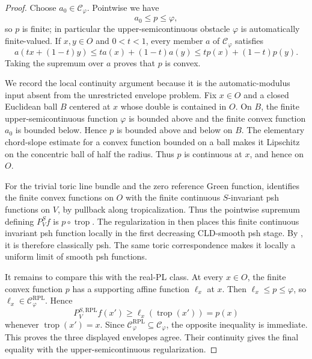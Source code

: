 \begin{proof}
Choose $a_0\in\mathcal C_\varphi$.  Pointwise we have
\[
                       a_0\leq p\leq\varphi,
\]
so $p$ is finite; in particular the upper-semicontinuous obstacle
\(\varphi\) is automatically finite-valued.  If $x,y\in O$ and $0<t<1$, every member $a$ of
\(\mathcal C_\varphi\) satisfies
\[
 a(tx+(1-t)y)\leq ta(x)+(1-t)a(y)
              \leq tp(x)+(1-t)p(y).
\]
Taking the supremum over $a$ proves that $p$ is convex.

We record the local continuity argument because it is the automatic-modulus
input absent from the unrestricted envelope problem.  Fix $x\in O$ and a
closed Euclidean ball $B$ centered at $x$ whose double is contained in $O$.
On $B$, the finite upper-semicontinuous function $\varphi$ is bounded above
and the finite convex function $a_0$ is bounded below.  Hence $p$ is bounded
above and below on $B$.  The elementary chord-slope estimate for a convex
function bounded on a ball makes it Lipschitz on the concentric ball of half
the radius.  Thus $p$ is continuous at $x$, and hence on $O$.

For the trivial toric line bundle and the zero reference Green function,
\cite[Theorem~5.3.11]{BGJKK25} identifies the finite convex functions on
$O$ with the finite continuous $S$-invariant psh functions on $V$, by
pullback along tropicalization.  Thus the pointwise supremum defining
$P^S_Vf$ is $p\circ\operatorname{trop}$.  The regularization in
 then places this
finite continuous invariant psh function locally in the first decreasing
CLD-smooth psh stage.  By , it is therefore
classically psh.  The same toric correspondence makes it locally a uniform
limit of smooth psh functions.

It remains to compare this with the real-PL class.  At every $x\in O$, the
finite convex function $p$ has a supporting affine function $\ell_x$ at $x$.
Then \(\ell_x\leq p\leq\varphi\), so
\(\ell_x\in\mathcal C_\varphi^{\mathrm{RPL}}\).  Hence
\[
 P^{S,\mathrm{RPL}}_Vf(x')
 \geq\ell_x(\operatorname{trop}(x'))=p(x)
\]
whenever \(\operatorname{trop}(x')=x\).  Since
\(\mathcal C_\varphi^{\mathrm{RPL}}\subseteq\mathcal C_\varphi\), the
opposite inequality is immediate.  This proves the three displayed
envelopes agree.  Their continuity gives the final equality with the
upper-semicontinuous regularization.
\end{proof}
